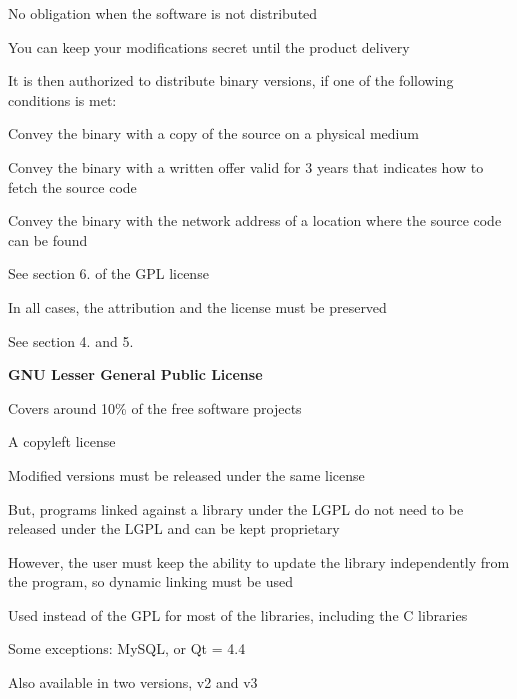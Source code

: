   \startitemize
  \item No obligation when the software is not distributed
    \startitemize
    \item You can keep your modifications secret until the product
      delivery
    \stopitemize
  \item It is then authorized to distribute binary versions, if one of
    the following conditions is met:
    \startitemize
    \item Convey the binary with a copy of the source on a physical
      medium
    \item Convey the binary with a written offer valid for 3 years
      that indicates how to fetch the source code
    \item Convey the binary with the network address of a location
      where the source code can be found
    \item See section 6. of the GPL license
    \stopitemize
  \item In all cases, the attribution and the license must be
    preserved
    \startitemize
    \item See section 4. and 5.
    \stopitemize
  \stopitemize

  \startitemize
  \item {\bf GNU Lesser General Public License}
  \item Covers around 10\% of the free software projects
  \item A copyleft license
    \startitemize
    \item Modified versions must be released under the same license
    \item But, programs linked against a library under the LGPL do not
      need to be released under the LGPL and can be kept proprietary
    \item However, the user must keep the ability to update the
      library independently from the program, so dynamic linking must
      be used
    \stopitemize
  \item Used instead of the GPL for most of the libraries, including
    the C libraries
    \startitemize
    \item Some exceptions: MySQL, or Qt = 4.4
    \stopitemize
  \item Also available in two versions, v2 and v3
  \stopitemize

